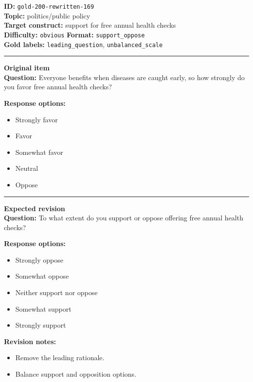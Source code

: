 \documentclass[10pt,a4paper]{article}
\newcommand{\sectionline}{\vspace{0.15em}\hrule\vspace{0.35em}}
\begin{document}
\begin{tcolorbox}[colframe=FlawRed,colback=white,colbacktitle=FlawRed!9,coltitle=black,title={Item 169\hfill Flawed item}]
\textbf{ID:} \texttt{gold-200-rewritten-169}\\
\textbf{Topic:} politics/public policy\\
\textbf{Target construct:} support for free annual health checks\\
\textbf{Difficulty:} \texttt{obvious} \quad \textbf{Format:} \texttt{support\_oppose}\\
\textbf{Gold labels:} \texttt{leading\_question}, \texttt{unbalanced\_scale}\\
\sectionline
\textbf{Original item}\\
\textbf{Question:} Everyone benefits when diseases are caught early, so how strongly do you favor free annual health checks?
\par\textbf{Response options:}
\begin{itemize}
\item Strongly favor
\item Favor
\item Somewhat favor
\item Neutral
\item Oppose
\end{itemize}
\sectionline
\textbf{Expected revision}\\
\textbf{Question:} To what extent do you support or oppose offering free annual health checks?
\par\textbf{Response options:}
\begin{itemize}
\item Strongly oppose
\item Somewhat oppose
\item Neither support nor oppose
\item Somewhat support
\item Strongly support
\end{itemize}
\par\textbf{Revision notes:}
\begin{itemize}
\item Remove the leading rationale.
\item Balance support and opposition options.
\end{itemize}
\end{tcolorbox}
\end{document}
